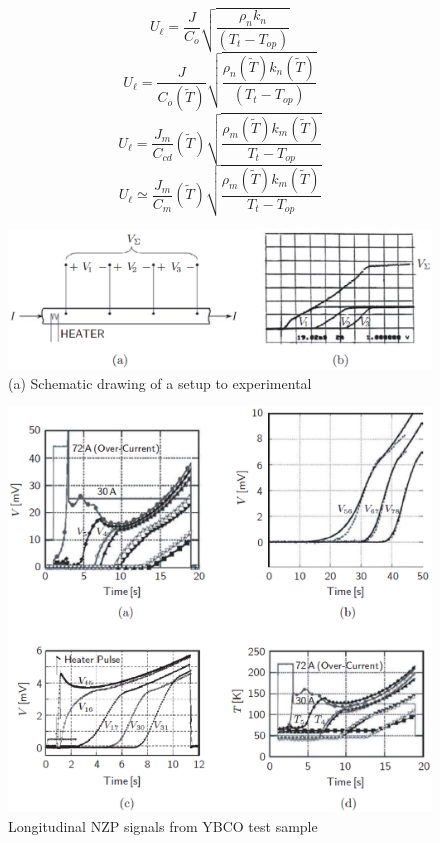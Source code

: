 \begin{equation}%
U_\ell=\frac{J}{C_o}\sqrt{\frac{\rho_nk_n}{(T_t-T_{op})}}
\end{equation}
\begin{equation}%
U_\ell=\frac{J}{C_o(\tilde{T})}\sqrt{\frac{\rho_n(\tilde{T})k_n(\tilde{T})}{(T_t-T_{op})}}
\end{equation}
\begin{equation}%
U_\ell=\frac{J_m}{C_{cd}}(\tilde{T})\sqrt{\frac{\rho_m(\tilde{T})k_m(\tilde{T})}{T_t-T_{op}}}
\end{equation}
\begin{equation}%
U_\ell\simeq\frac{J_m}{C_m}(\tilde{T})\sqrt{\frac{\rho_m(\tilde{T})k_m(\tilde{T})}{T_t-T_{op}}}
\end{equation}


\begin{figure}
	\centering
	\includegraphics[scale=0.6]{chpt8/figs/fig8.9.eps}
	\caption{(a) Schematic drawing of a setup to experimental}
\end{figure}


\begin{figure}
	\centering
	\includegraphics[scale=0.6]{chpt8/figs/fig8.10.eps}
	\caption{Longitudinal NZP signals from YBCO test sample}
\end{figure}



